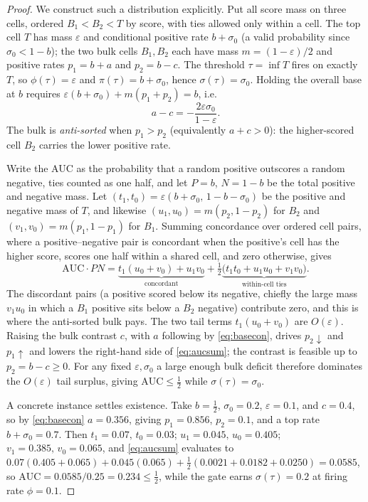 \documentclass{sbc2023}%
\theoremstyle{definition}
\theoremstyle{plain}
\begin{document}
\begin{proof}
We construct such a distribution explicitly. Put all score mass on three cells,
ordered $B_1 < B_2 < T$ by score, with ties allowed only within a cell. The top cell
$T$ has mass $\varepsilon$ and conditional positive rate $b+\sigma_0$ (a valid
probability since $\sigma_0<1-b$); the two bulk cells $B_1,B_2$ each have mass
$m=(1-\varepsilon)/2$ and positive rates $p_1=b+a$ and $p_2=b-c$. The threshold
$\tau=\inf T$ fires on exactly $T$, so $\phi(\tau)=\varepsilon$ and
$\pi(\tau)=b+\sigma_0$, hence $\sigma(\tau)=\sigma_0$. Holding the overall base at $b$
requires $\varepsilon(b+\sigma_0)+m(p_1+p_2)=b$, i.e.
\begin{equation}
\label{eq:basecon}
a-c=-\frac{2\varepsilon\sigma_0}{1-\varepsilon}.
\end{equation}
The bulk is \emph{anti-sorted} when $p_1>p_2$ (equivalently $a+c>0$): the
higher-scored cell $B_2$ carries the lower positive rate.

Write the AUC as the probability that a random positive outscores a random negative,
ties counted as one half, and let $P=b$, $N=1-b$ be the total positive and negative
mass. Let $(t_1,t_0)=\varepsilon(b+\sigma_0,\,1-b-\sigma_0)$ be the positive and
negative mass of $T$, and likewise $(u_1,u_0)=m(p_2,1-p_2)$ for $B_2$ and
$(v_1,v_0)=m(p_1,1-p_1)$ for $B_1$. Summing concordance over ordered cell pairs, where
a positive--negative pair is concordant when the positive's cell has the higher score,
scores one half within a shared cell, and zero otherwise, gives
\begin{equation}
\label{eq:aucsum}
\mathrm{AUC}\cdot PN
=\underbrace{t_1(u_0+v_0)+u_1 v_0}_{\text{concordant}}
+\tfrac12\underbrace{\big(t_1 t_0+u_1 u_0+v_1 v_0\big)}_{\text{within-cell ties}} .
\end{equation}
The discordant pairs (a positive scored below its negative, chiefly the large mass
$v_1 u_0$ in which a $B_1$ positive sits below a $B_2$ negative) contribute zero, and
this is where the anti-sorted bulk pays. The two tail terms $t_1(u_0+v_0)$ are
$O(\varepsilon)$. Raising the bulk contrast $c$, with $a$ following by
\eqref{eq:basecon}, drives $p_2\!\downarrow$ and $p_1\!\uparrow$ and lowers the
right-hand side of \eqref{eq:aucsum}; the contrast is feasible up to $p_2=b-c\ge 0$.
For any fixed $\varepsilon,\sigma_0$ a large enough bulk deficit therefore dominates the
$O(\varepsilon)$ tail surplus, giving $\mathrm{AUC}\le\tfrac12$ while $\sigma(\tau)=\sigma_0$.

A concrete instance settles existence. Take $b=\tfrac12$, $\sigma_0=0.2$,
$\varepsilon=0.1$, and $c=0.4$, so by \eqref{eq:basecon} $a=0.356$, giving $p_1=0.856$,
$p_2=0.1$, and a top rate $b+\sigma_0=0.7$. Then $t_1=0.07,\,t_0=0.03$;
$u_1=0.045,\,u_0=0.405$; $v_1=0.385,\,v_0=0.065$, and \eqref{eq:aucsum} evaluates to
$0.07(0.405{+}0.065)+0.045(0.065)+\tfrac12(0.0021{+}0.0182{+}0.0250)=0.0585$, so
$\mathrm{AUC}=0.0585/0.25=0.234\le\tfrac12$, while the gate earns $\sigma(\tau)=0.2$ at
firing rate $\phi=0.1$.
\end{proof}
\end{document}
